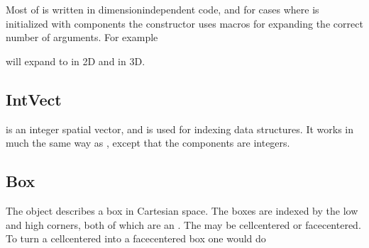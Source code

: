 \documentclass[letterpaper,10pt,english]{sphinxmanual}
\begin{document}
\sphinxAtStartPar
Most of  is written in dimension\sphinxhyphen{}independent code, and for cases where  is initialized with components the constructor uses  macros for expanding the correct number of arguments.
For example

\begin{sphinxVerbatim}[commandchars=\\\{\},formatcom=\scriptsize]
   
\end{sphinxVerbatim}

\sphinxAtStartPar
will expand to  in 2D and  in 3D.


\subsection{IntVect}
\label{\detokenize{Source/ChomboBasics:intvect}}
\sphinxAtStartPar
{} is an integer spatial vector, and is used for indexing data structures.
It works in much the same way as , except that the components are integers.


\subsection{Box}
\label{\detokenize{Source/ChomboBasics:box}}
\sphinxAtStartPar
The  object describes a box in Cartesian space.
The boxes are indexed by the low and high corners, both of which are an .
The  may be cell\sphinxhyphen{}centered or face\sphinxhyphen{}centered.
To turn a cell\sphinxhyphen{}centered  into a face\sphinxhyphen{}centered box one would do

\begin{sphinxVerbatim}[commandchars=\\\{\},formatcom=\scriptsize]
   
                
\end{sphinxVerbatim}
\end{document}
